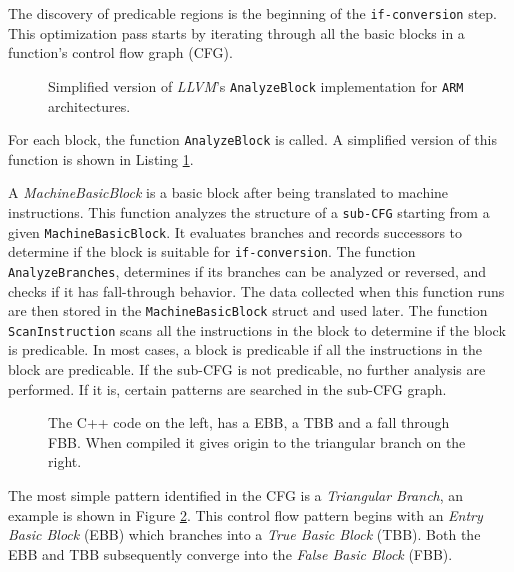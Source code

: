 The discovery of predicable regions is the beginning of the \texttt{if-conversion} step. This optimization pass starts by iterating through all the basic blocks in a function's control flow graph (CFG).

\begin{figure}[H]
    \centering
    
    \caption[\texttt{AnalyzeBlock} Implementation for \texttt{ARM} Architectures]{Simplified version of \textit{LLVM}'s \texttt{AnalyzeBlock} implementation for \texttt{ARM} architectures.}
    \label{fig:analyze_block}
\end{figure}

For each block, the function \texttt{AnalyzeBlock} is called. A simplified version of this function is shown in Listing \ref{fig:analyze_block}.

A \textit{MachineBasicBlock} is a basic block after being translated to machine instructions.
This function analyzes the structure of a \texttt{sub-CFG} starting from a given \texttt{MachineBasicBlock}. It evaluates branches and records successors to determine if the block is suitable for \texttt{if-conversion}.
The function \texttt{AnalyzeBranches}, determines if its branches can be analyzed or reversed, and checks if it has fall-through behavior. The data collected when this function runs are then stored in the \texttt{MachineBasicBlock} struct and used later. The function \texttt{ScanInstruction} scans all the instructions in the block to determine if the block is predicable. In most cases, a block is predicable if all the instructions in the block are predicable.
If the sub-CFG is not predicable, no further analysis are performed. If it is, certain patterns are searched in the sub-CFG graph. \\

\begin{figure}[H]
    \centering
    
    \caption[TBB and fall through FBB]{The C++ code on the left, has a EBB, a TBB and a fall through FBB. When compiled it gives origin to the triangular branch on the right.}
    \label{fig:triangle_branch}
\end{figure}

The most simple pattern identified in the CFG is a \textit{Triangular Branch}, an example is shown in Figure \ref{fig:triangle_branch}. This control flow pattern begins with an \textit{Entry Basic Block} (EBB) which branches into a \textit{True Basic Block} (TBB). Both the EBB and TBB subsequently converge into the \textit{False Basic Block} (FBB).

